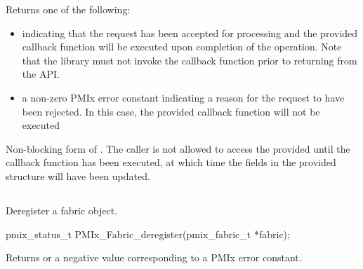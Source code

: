 \begin{arglist}
\end{arglist}

Returns one of the following:

\begin{itemize}
\item {} indicating that the request has been accepted for processing and the provided callback function will be executed upon completion of the operation. Note that the library must not invoke the callback function prior to returning from the \ac{API}.
\item a non-zero \ac{PMIx} error constant indicating a reason for the request to have been rejected. In this case, the provided callback function will not be executed
\end{itemize}

\descr

Non-blocking form of . The caller is not allowed to access the provided  until the callback function has been executed, at which time the fields in the provided  structure will have been updated.


\subsection{}

\summary

Deregister a fabric object.

\format

\cspecificstart
\begin{codepar}
pmix_status_t
PMIx_Fabric_deregister(pmix_fabric_t *fabric);
\end{codepar}
\cspecificend

\begin{arglist}
\end{arglist}

Returns  or a negative value corresponding to a \ac{PMIx} error constant.

